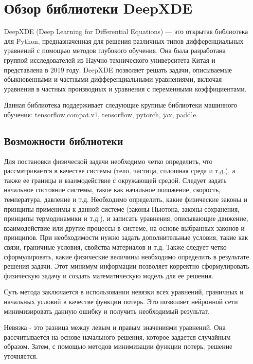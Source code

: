 \chapter{Обзор библиотеки DeepXDE}

DeepXDE (Deep Learning for Differential Equations)\cite{lu2021deepxde} –-- это открытая библиотека для Python,
предназначенная для решения различных типов дифференциальных уравнений с помощью методов
глубокого обучения. Она была разработана группой исследователей из Научно-технического
университета Китая и представлена в 2019 году. DeepXDE позволяет решать задачи, описываемые
обыкновенными и частными дифференциальными уравнениями, включая уравнения в частных производных и
уравнения с переменными коэффициентами.

Данная библиотека поддерживает следующие крупные библиотеки машинного обучения: tensorflow.compat.v1,
tensorflow, pytorch, jax, paddle.

\section{Возможности библиотеки}
Для постановки физической задачи необходимо четко определить, что рассматривается в качестве системы
(тело, частица, сплошная среда и т.д.), а также ее границы и взаимодействие с окружающей средой.
Следует задать начальное состояние системы, такое как начальное положение, скорость, температура,
давление и т.д. Необходимо определить, какие физические законы и принципы применимы к данной системе
(законы Ньютона, законы сохранения, принципы термодинамики и т.д.), и записать уравнения, описывающие
движение, взаимодействие или другие процессы в системе, на основе выбранных законов и принципов. При
необходимости нужно задать дополнительные условия, такие как связи, граничные условия, свойства
материалов и т.д. Также следует четко сформулировать, какие физические величины необходимо определить
в результате решения задачи. Этот минимум информации позволяет корректно сформулировать физическую
задачу и создать математическую модель для ее решения.

Суть метода заключается в использовании невязки всех уравнений, граничных и начальных условий в качестве
функции потерь. Это позволяет нейронной сети минимизировать данную ошибку и получить необходимый результат.

Невязка - это разница между левым и правым значениями уравнений. Она рассчитывается на основе начального решения,
которое задается случайным образом. Затем, с помощью методов минимизации функции потерь, решение уточняется.

